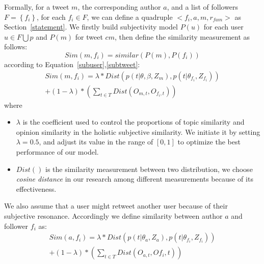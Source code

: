 \documentclass[twocolumn]{svjour3}          %
\begin{document}
Formally, for a tweet $ m $, the corresponding author $ a $, and a list of followers $ F= \left\lbrace f_{i} \right\rbrace  $, for each $ f_{i} \in F $, we can define a quadruple $ < f_{i}, a, m, r_{fam} >  $ as Section~\ref{statement}.
We firstly build subjectivity model  $ P\left( u \right)  $ for each user $ u \in F \bigcup p $ and $ P\left( m \right)  $ for tweet $ cm $, then define the similarity measurement as follows:
\begin{equation}
Sim\left( m,f_{i} \right) = similar\left( P\left( m \right), P\left( f_{i} \right) \right)
\end{equation}
according to Equation~\ref{subuser},\ref{subtweet}:
\begin{equation}
\label{tweetfollower}
\begin{split}
Sim\left( m,f_{i} \right) = \lambda \ast Dist\left( p\left(t \vert \theta, \beta, Z_{m} \right), p\left( t \vert \theta_{f_{i}}, Z_{f_{i}} \right) \right) \\
+\left(1-\lambda \right) \ast \left( \sum_{t \in T} Dist \left( O_{m,t}, O_{f_{i}, t} \right)  \right)
\end{split}
\end{equation}
where 
\begin{itemize}
\item $ \lambda $ is the coefficient used to control the proportions of topic similarity and opinion similarity in the holistic subjective similarity. We initiate it by setting $ \lambda =0.5 $, and adjust its value in the range of $ [0,1] $ to optimize the best performance of our model. 
\item $ Dist() $ is the similarity measurement between two distribution, we choose \emph{cosine distance } in our research among different measurements because of its effectiveness. 
\end{itemize}
We also assume that a user might retweet another user because of their subjective resonance. Accordingly we define similarity between author $ a $ and follower $ f_{i} $ as:
\begin{equation}
\label{pubfollower}
\begin{split}
Sim\left( a,f_{i} \right) = \lambda \ast Dist\left( p\left( t \vert \theta_{a}, Z_{a} \right), p\left( t \vert \theta_{f_{i}}, Z_{f_{i}} \right) \right) \\
+\left(1-\lambda \right) \ast \left( \sum_{t \in T} Dist \left( O_{a,t}, O{f_{i}, t} \right)  \right)
\end{split}
\end{equation}
\end{document}
